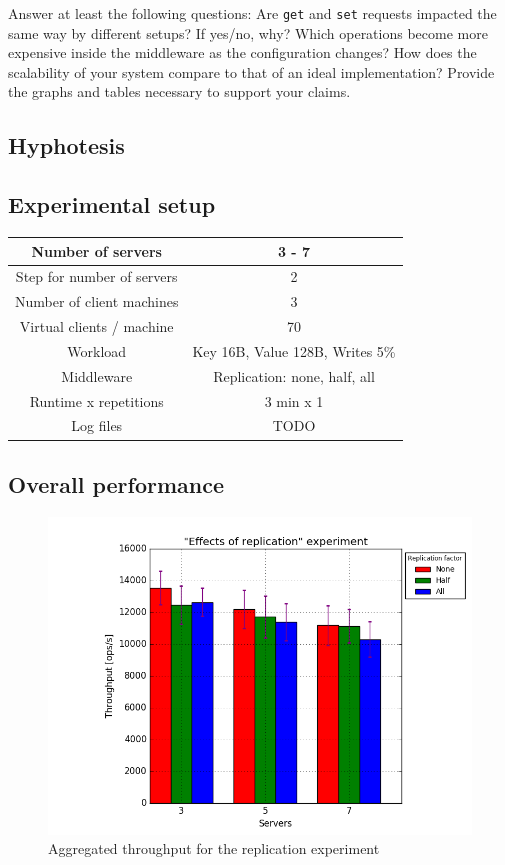\documentclass[11pt]{article}
\begin{document}
Answer at least the following questions: Are \texttt{get} and \texttt{set} requests impacted the same way by different setups? If yes/no, why? Which operations become more expensive inside the middleware as the configuration changes? How does the scalability of your system compare to that of an ideal implementation? Provide the graphs and tables necessary to support your claims.
\fi

\subsection{Hyphotesis}

\subsection{Experimental setup}

\small{
\smallskip
\begin{tabular}{|c|c|}
\hline Number of servers & 3 - 7 \\ 
\hline Step for number of servers & 2 \\
\hline Number of client machines & 3 \\ 
\hline Virtual clients / machine &  70 \\ 
\hline Workload & Key 16B, Value 128B, Writes 5\% \\
\hline Middleware & Replication: none, half, all \\ 
\hline Runtime x repetitions & 3 min x 1 \\ 
\hline Log files & TODO \\
\hline 
\end{tabular} }
\medskip

\subsection{Overall performance}
\begin{figure}
\centering
	\includegraphics[width=0.7\linewidth]{plots/replication}

\caption{Aggregated throughput for the replication experiment}
\label{fig:replication-overall}
\end{figure}
\end{document}
